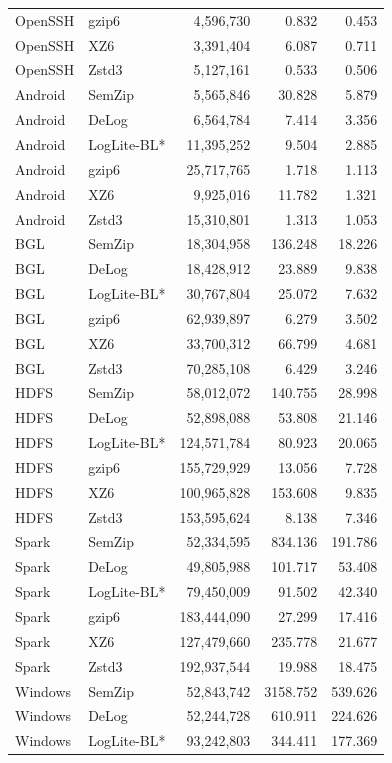 \begin{longtable}{llrrr}
OpenSSH & gzip6 & 4,596,730 & 0.832 & 0.453 \\
OpenSSH & XZ6 & 3,391,404 & 6.087 & 0.711 \\
OpenSSH & Zstd3 & 5,127,161 & 0.533 & 0.506 \\
Android & SemZip & 5,565,846 & 30.828 & 5.879 \\
Android & DeLog & 6,564,784 & 7.414 & 3.356 \\
Android & LogLite-BL* & 11,395,252 & 9.504 & 2.885 \\
Android & gzip6 & 25,717,765 & 1.718 & 1.113 \\
Android & XZ6 & 9,925,016 & 11.782 & 1.321 \\
Android & Zstd3 & 15,310,801 & 1.313 & 1.053 \\
BGL & SemZip & 18,304,958 & 136.248 & 18.226 \\
BGL & DeLog & 18,428,912 & 23.889 & 9.838 \\
BGL & LogLite-BL* & 30,767,804 & 25.072 & 7.632 \\
BGL & gzip6 & 62,939,897 & 6.279 & 3.502 \\
BGL & XZ6 & 33,700,312 & 66.799 & 4.681 \\
BGL & Zstd3 & 70,285,108 & 6.429 & 3.246 \\
HDFS & SemZip & 58,012,072 & 140.755 & 28.998 \\
HDFS & DeLog & 52,898,088 & 53.808 & 21.146 \\
HDFS & LogLite-BL* & 124,571,784 & 80.923 & 20.065 \\
HDFS & gzip6 & 155,729,929 & 13.056 & 7.728 \\
HDFS & XZ6 & 100,965,828 & 153.608 & 9.835 \\
HDFS & Zstd3 & 153,595,624 & 8.138 & 7.346 \\
Spark & SemZip & 52,334,595 & 834.136 & 191.786 \\
Spark & DeLog & 49,805,988 & 101.717 & 53.408 \\
Spark & LogLite-BL* & 79,450,009 & 91.502 & 42.340 \\
Spark & gzip6 & 183,444,090 & 27.299 & 17.416 \\
Spark & XZ6 & 127,479,660 & 235.778 & 21.677 \\
Spark & Zstd3 & 192,937,544 & 19.988 & 18.475 \\
Windows & SemZip & 52,843,742 & 3158.752 & 539.626 \\
Windows & DeLog & 52,244,728 & 610.911 & 224.626 \\
Windows & LogLite-BL* & 93,242,803 & 344.411 & 177.369 \\

\end{longtable}
